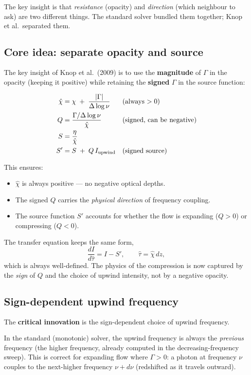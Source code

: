 \documentclass[11pt]{article}
\begin{document}
The key insight is that \emph{resistance} (opacity) and
\emph{direction} (which neighbour to ask) are two different things.  The
standard solver bundled them together; Knop et al.\ separated them.

\subsection{Core idea: separate opacity and source}

The key insight of Knop et al.\ (2009) is to use the
\textbf{magnitude} of $\Gamma$ in the opacity (keeping it positive)
while retaining the \textbf{signed} $\Gamma$ in the source function:

\begin{align}
  \hat\chi &= \chi \;+\; \frac{|\Gamma|}{\Delta\log\nu}
            &&\text{(always $> 0$)} \\
  Q        &= \frac{\Gamma/\Delta\log\nu}{\hat\chi}
            &&\text{(signed, can be negative)} \\
  S        &= \frac{\eta}{\hat\chi} \\
  S'       &= S \;+\; Q\, I_{\rm upwind}
            &&\text{(signed source)}
\end{align}

This ensures:
\begin{itemize}[nosep]
  \item $\hat\chi$ is always positive --- no negative optical depths.
  \item The signed $Q$ carries the \emph{physical direction} of
        frequency coupling.
  \item The source function $S'$ accounts for whether the flow is
        expanding ($Q > 0$) or compressing ($Q < 0$).
\end{itemize}

The transfer equation keeps the same form,
\[
  \frac{dI}{d\hat\tau} = I - S',
  \qquad \hat\tau = \hat\chi\, dz,
\]
which is always well-defined.  The physics of the compression is now
captured by the \emph{sign} of $Q$ and the choice of upwind intensity,
not by a negative opacity.

\subsection{Sign-dependent upwind frequency}

The \textbf{critical innovation} is the sign-dependent choice of upwind
frequency.

In the standard (monotonic) solver, the upwind frequency is always the
\emph{previous} frequency (the higher frequency, already computed in the
decreasing-frequency sweep).  This is correct for expanding flow where
$\Gamma > 0$: a photon at frequency $\nu$ couples to the next-higher
frequency $\nu + d\nu$ (redshifted as it travels outward).
\end{document}
